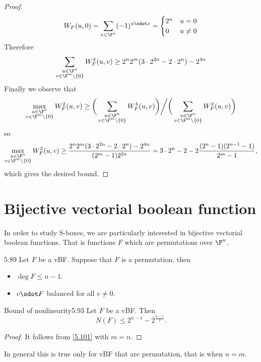 \begin{proof}
	\[
		W_F(u,0) = \sum_{x\in\F^n}(-1)^{u\sdot x} =
		\begin{cases}
			2^n & u=0       \\
			0   & u \neq 0
		\end{cases}
	\]
	Therefore
	\[
		\sum_{\substack{u\in\F^n\\v\in\F^m\setminus\{0\}}}W_F^4(u,v) \ge 2^n2^m (3\cdot 2^{2n}-2\cdot 2^n) - 2^{4n}
	\]
	Finally we observe that
	\[
		\max_{\substack{u\in\F^n\\v\in\F^m\setminus\{0\}}}W_F^2(u,v) \ge \bigg(\sum_{\substack{u\in\F^n\\v\in\F^m\setminus\{0\}}}W_F^4(u,v)\bigg) \bigg/ \bigg(\sum_{\substack{u\in\F^n\\v\in\F^m\setminus\{0\}}}W_F^2(u,v)\bigg)
	\]
	so
	\[
		\max_{\substack{u\in\F^n\\v\in\F^m\setminus\{0\}}}W_F^2(u,v) \ge \frac{ 2^n2^m (3\cdot 2^{2n}-2\cdot 2^n) - 2^{4n}}{(2^m-1)2^{2n}} = 3\cdot 2^n -2-2 \frac{(2^n-1)(2^{n-1}-1)}{2^m-1},
	\]
	which gives the desired bound.
\end{proof}


\section{Bijective vectorial boolean function}

In order to study S-boxes, we are particularly interested in bijective vectorial boolean functions. That is functions \(F\) which are permutations over \(\F^n\).

\begin{teor}{}{5.89}
	Let \(F\) be a vBF. Suppose that \(F\) is a permutation, then
	\begin{itemize}
		\item \(\deg F \le n-1\).
		\item \(v\sdot F\) balanced for all \(v \neq 0\).
	\end{itemize}
\end{teor}

\begin{teor}{Bound of nonlinearity}{5.93}
	Let \(F\) be a vBF. Then
	\[
		N(F) \le 2^{n-1}-2^{\frac{n-1}{2}}.
	\]
\end{teor}

\begin{proof}
	It follows from \autoref{5.101} with \(m=n\).
\end{proof}

\begin{oss}
	In general this is true only for vBF that are permutation, that is when \(n=m\).
\end{oss}



